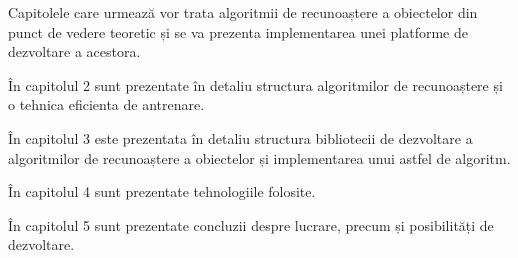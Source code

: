 Capitolele care urmează vor trata algoritmii de recunoaștere a obiectelor din punct de vedere teoretic și se va prezenta implementarea unei platforme de dezvoltare a acestora.

În capitolul 2 sunt prezentate în detaliu structura algoritmilor de recunoaștere și o tehnica eficienta de antrenare.

În capitolul 3 este prezentata în detaliu structura bibliotecii de dezvoltare a algoritmilor de recunoaștere a obiectelor și implementarea unui astfel de algoritm.

În capitolul 4 sunt prezentate tehnologiile folosite.

În capitolul 5 sunt prezentate concluzii despre lucrare, precum și posibilități de dezvoltare.

\pagebreak